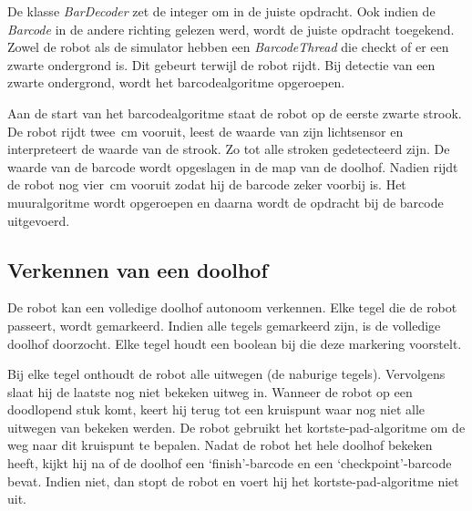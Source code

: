 \documentclass[eind]{penoverslag}
\begin{document}
De klasse \textit{BarDecoder} zet de integer om in de juiste opdracht. Ook indien de \textit{Barcode} in de andere richting gelezen werd, wordt de juiste opdracht toegekend.\\

Zowel de robot als de simulator hebben een \textit{BarcodeThread} die checkt of er een zwarte ondergrond is. Dit gebeurt terwijl de robot rijdt. Bij detectie van een zwarte ondergrond, wordt het barcodealgoritme opgeroepen.

Aan de start van het barcodealgoritme staat de robot op de eerste zwarte strook. De robot rijdt twee~cm vooruit, leest de waarde van zijn lichtsensor en interpreteert de waarde van de strook. Zo tot alle stroken gedetecteerd zijn. De waarde van de barcode wordt opgeslagen in de map van de doolhof. Nadien rijdt de robot nog vier~cm vooruit zodat hij de barcode zeker voorbij is. Het muuralgoritme wordt opgeroepen en daarna wordt de opdracht bij de barcode uitgevoerd.


\subsection{Verkennen van een doolhof} %
\label{ssec:algoOnderzDoolhof}

De robot kan een volledige doolhof autonoom verkennen. Elke tegel die de robot passeert, wordt gemarkeerd. Indien alle tegels gemarkeerd zijn, is de volledige doolhof doorzocht. Elke tegel houdt een boolean bij die deze markering voorstelt.

Bij elke tegel onthoudt de robot alle uitwegen (de naburige tegels). Vervolgens slaat hij de laatste nog niet bekeken uitweg in. Wanneer de robot op een doodlopend stuk komt, keert hij terug tot een kruispunt waar nog niet alle uitwegen van bekeken werden. De robot gebruikt het kortste-pad-algoritme om de weg naar dit kruispunt te bepalen.
Nadat de robot het hele doolhof bekeken heeft, kijkt hij na of de doolhof een `finish'-barcode en een `checkpoint'-barcode bevat. Indien niet, dan stopt de robot en voert hij het kortste-pad-algoritme niet uit.\\
\end{document}

